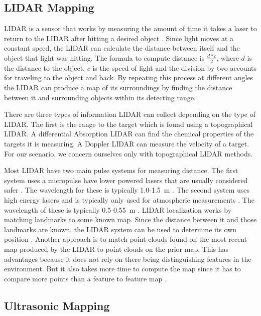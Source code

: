 \documentclass{article}
\begin{document}
  \subsection{LIDAR Mapping}
    LIDAR is a sensor that works by measuring the amount of time it takes a laser to return to the LIDAR after hitting a desired object \cite{keith_lidar_2007}. Since light moves at a constant speed, the LIDAR can calculate the distance between itself and the object that light was hitting. The formula to compute distance is $\frac{d*c}{2}$, where $d$ is the distance to the object, $c$ is the speed of light and the division by two accounts for traveling to the object and back. By repeating this process at different angles the LIDAR can produce a map of its surroundings by finding the distance between it and surrounding objects within its detecting range.

    There are three types of information LIDAR can collect depending on the type of LIDAR. The first is the range to the target which is found using a topographical LIDAR. A differential Absorption LIDAR can find the chemical properties of the targets it is measuring. A Doppler LIDAR can measure the velocity of a target. For our scenario, we concern ourselves only with topographical LIDAR methods.

    Most LIDAR have two main pulse systems for measuring distance. The first system uses a micropulse have lower powered lasers that are usually considered safer \cite{keith_lidar_2007}. The wavelength for these is typically 1.0-\SI{1.5}{\meter} \cite{lidar_uk_how_2017}. The second system uses high energy lasers and is typically only used for atmospheric measurements \cite{keith_lidar_2007}. The wavelength of these is typically 0.5-\SI{0.55}{\meter} \cite{lidar_uk_how_2017}.
    LIDAR localization works by matching landmarks to some known map. Since the distance between it and those landmarks are known, the LIDAR system can be used to determine its own position \cite{schlichting_vehicle_2016}. Another approach is to match point clouds found on the most recent map produced by the LIDAR to point clouds on the prior map. This has advantages because it does not rely on there being distinguishing features in the environment. But it also takes more time to compute the map since it has to compare more points than a feature to feature map \cite{li_extracting_2010}.


  \subsection{Ultrasonic Mapping}
\end{document}
